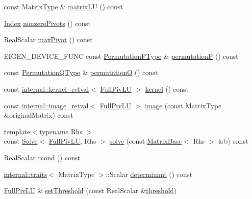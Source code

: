 \begin{DoxyCompactItemize}
\item 
const Matrix\+Type \& \hyperlink{group___l_u___module_afea0b8fc707a9097d46fe358cb18bbff}{matrix\+LU} () const
\item 
\hyperlink{group___core___module_a554f30542cc2316add4b1ea0a492ff02}{Index} \hyperlink{group___l_u___module_aa71132a751ad3c78178e33d6b2987400}{nonzero\+Pivots} () const
\item 
Real\+Scalar \hyperlink{group___l_u___module_abced9f280f5fc49c2e62605c782b237b}{max\+Pivot} () const
\item 
E\+I\+G\+E\+N\+\_\+\+D\+E\+V\+I\+C\+E\+\_\+\+F\+U\+NC const \hyperlink{group___core___module}{Permutation\+P\+Type} \& \hyperlink{group___l_u___module_a09274c82240f6441af5e6c99e24e756d}{permutationP} () const
\item 
const \hyperlink{group___core___module}{Permutation\+Q\+Type} \& \hyperlink{group___l_u___module_a8d18190c7618de271cba7293f0493a36}{permutationQ} () const
\item 
const \hyperlink{struct_eigen_1_1internal_1_1kernel__retval}{internal\+::kernel\+\_\+retval}$<$ \hyperlink{group___l_u___module_class_eigen_1_1_full_piv_l_u}{Full\+Piv\+LU} $>$ \hyperlink{group___l_u___module_a70f52eeb2cd07dfbf790fce106fb4015}{kernel} () const
\item 
const \hyperlink{struct_eigen_1_1internal_1_1image__retval}{internal\+::image\+\_\+retval}$<$ \hyperlink{group___l_u___module_class_eigen_1_1_full_piv_l_u}{Full\+Piv\+LU} $>$ \hyperlink{group___l_u___module_a0893985d2dab367baa6e57c6fd0c4956}{image} (const Matrix\+Type \&original\+Matrix) const
\item 
{\footnotesize template$<$typename Rhs $>$ }\\const \hyperlink{group___core___module_class_eigen_1_1_solve}{Solve}$<$ \hyperlink{group___l_u___module_class_eigen_1_1_full_piv_l_u}{Full\+Piv\+LU}, Rhs $>$ \hyperlink{group___l_u___module_af563471f6f3283fd10779ef02dd0b748}{solve} (const \hyperlink{group___core___module_class_eigen_1_1_matrix_base}{Matrix\+Base}$<$ Rhs $>$ \&b) const
\item 
Real\+Scalar \hyperlink{group___l_u___module_a0bc63f910960dc3e35acecc8442025b6}{rcond} () const
\item 
\hyperlink{struct_eigen_1_1internal_1_1traits}{internal\+::traits}$<$ Matrix\+Type $>$\+::Scalar \hyperlink{group___l_u___module_a25d0b21682313c33f82988c708c4616f}{determinant} () const
\item 
\hyperlink{group___l_u___module_class_eigen_1_1_full_piv_l_u}{Full\+Piv\+LU} \& \hyperlink{group___l_u___module_a414592d82de98f5bd075965caf56d681}{set\+Threshold} (const Real\+Scalar \&\hyperlink{group___l_u___module_ad77539203694f2d85ff7d11616e5a0a5}{threshold})

\end{DoxyCompactItemize}

